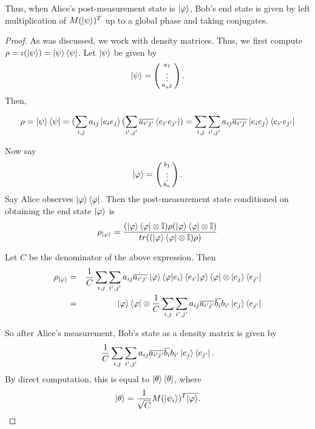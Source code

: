 Thus, when Alice's post-measurement state is $\ket{\varphi}$, Bob's end state is given by left multiplication of $M(\ket{\psi})^T$ up to a global phase and taking conjugates.

\begin{proof}
As was discussed, we work with density matrices.  Thus, we first compute $\rho=\iota(\ket{\psi})=\ket{\psi}\bra{\psi}$.  Let $\ket{\psi}$ be given by 
\begin{equation}
\ket{\psi}=\left(\begin{smallmatrix}a_1\\ \vdots \\a_{n^2}\end{smallmatrix}\right).
\end{equation}
Then, 

\begin{equation}
\rho=\ket{\psi}\bra{\psi}=(\sum_{i,j} a_{ij}\ket{e_i e_j}(\sum_{i',j'} \overline{a_{i'j'}}\bra{e_{i'} e_{j'}})=\sum_{i,j} \sum_{i',j'} a_{ij} \overline{a_{i'j'}}\ket{e_i e_j}\bra{e_{i'} e_{j'}}   
\end{equation}

Now say
\begin{equation}
\ket{\varphi}=\left(\begin{smallmatrix}b_1\\ \vdots \\b_n\end{smallmatrix}\right).
\end{equation}
Say Alice observes $\ket{\varphi}\bra{\varphi}$.
Then the post-measurement state conditioned on obtaining the end state $\ket{\varphi}$ is
\begin{equation}
\rho_{\ket{\varphi}}=\frac{(\ket{\varphi}\bra{\varphi} \otimes \mathbb{I})\rho(\ket{\varphi}\bra{\varphi} \otimes \mathbb{I})}{tr((\ket{\varphi}\bra{\varphi} \otimes \mathbb{I})\rho)}
\end{equation}

Let $C$ be the denominator of the above expression. Then 
\begin{eqnarray}
\rho_{\ket{\varphi}}&=&\frac{1}{C} \sum_{i,j} \sum_{{i'}, {j'}} a_{ij} \overline{a_{i'j'}}\ket{\varphi}\braket{\varphi|e_i}\braket{e_{i'}|\varphi}\bra{\varphi} \otimes \ket{e_j}\bra{e_{j'}}\\
&=&\ket{\varphi}\bra{\varphi} \otimes \frac{1}{C} \sum_{i,j} \sum_{{i'}, {j'}} a_{ij} \overline{a_{i'j'}}\overline{b_i}b_{i'}\ket{e_j}\bra{e_{j'}}
\end{eqnarray}

So after Alice's measurement, Bob's state as a density matrix is given by
\begin{equation}
    \frac{1}{C} \sum_{i,j} \sum_{{i'}, {j'}} a_{ij} \overline{a_{i'j'}}\overline{b_i}b_{i'}\ket{e_j}\bra{e_{j'}}.
\end{equation}
By direct computation, this is equal to $\ket{\theta}\bra{\theta}$, where
\begin{equation}
    \ket{\theta}=\frac{1}{\sqrt{C}} M(\ket{\psi_i})^T \overline{\ket{\varphi}}.
\end{equation}


\end{proof}
